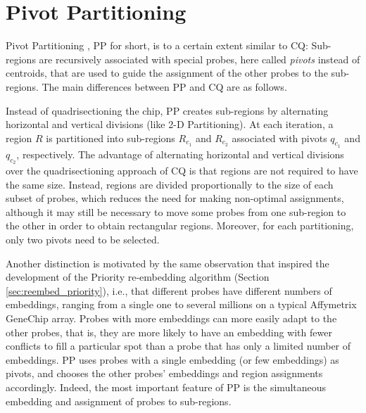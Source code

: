\section{Pivot Partitioning}
\label{sec:part_pp}

Pivot Partitioning \citep{Carvalho2006}, PP for short, is to a certain extent
similar to CQ: Sub-regions are recursively associated with special probes, here
called \emph{pivots} instead of centroids, that are used to guide the assignment
of the other probes to the sub-regions. The main differences between PP and CQ
are as follows.

Instead of quadrisectioning the chip, PP creates sub-regions by alternating
horizontal and vertical divisions (like 2-D Partitioning). At each iteration, a
region $R$ is partitioned into sub-regions $R_{c_1}$ and $R_{c_2}$ associated
with pivots $q_{c_1}$ and $q_{c_2}$, respectively. The advantage of alternating
horizontal and vertical divisions over the quadrisectioning approach of CQ is
that regions are not required to have the same size. Instead, regions are
divided proportionally to the size of each subset of probes, which reduces the
need for making non-optimal assignments, although it may still be necessary to
move some probes from one sub-region to the other in order to obtain rectangular
regions. Moreover, for each partitioning, only two pivots need to be selected.

Another distinction is motivated by the same observation that inspired the
development of the Priority re-embedding algorithm (Section
\ref{sec:reembed_priority}), i.e., that different probes have different numbers
of embeddings, ranging from a single one to several millions on a typical
Affymetrix GeneChip array. Probes with more embeddings can more easily adapt to
the other probes, that is, they are more likely to have an embedding with fewer
conflicts to fill a particular spot than a probe that has only a limited number
of embeddings. PP uses probes with a single embedding (or few embeddings) as
pivots, and chooses the other probes' embeddings and region assignments
accordingly. Indeed, the most important feature of PP is the simultaneous
embedding and assignment of probes to sub-regions.

